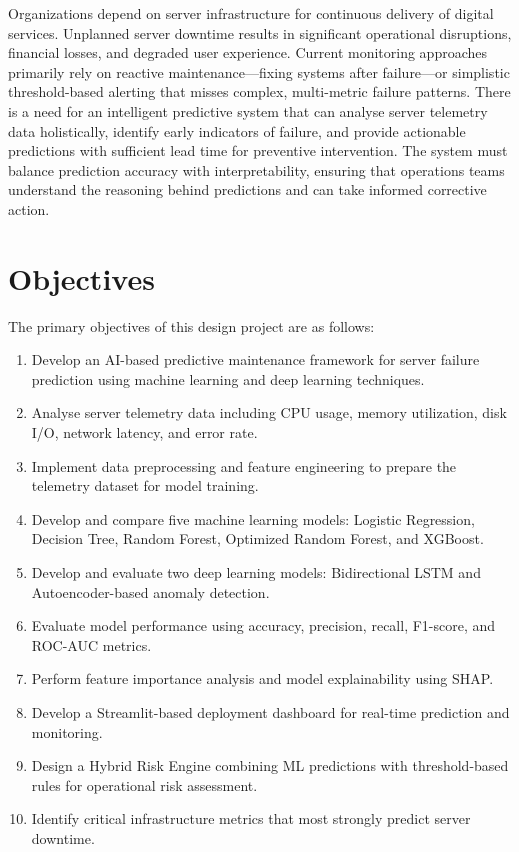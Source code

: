\documentclass[12pt,letterpaper]{report}
\begin{document}
Organizations depend on server infrastructure for continuous delivery of digital services. Unplanned server downtime results in significant operational disruptions, financial losses, and degraded user experience. Current monitoring approaches primarily rely on reactive maintenance---fixing systems after failure---or simplistic threshold-based alerting that misses complex, multi-metric failure patterns. There is a need for an intelligent predictive system that can analyse server telemetry data holistically, identify early indicators of failure, and provide actionable predictions with sufficient lead time for preventive intervention. The system must balance prediction accuracy with interpretability, ensuring that operations teams understand the reasoning behind predictions and can take informed corrective action.

\section{Objectives}

The primary objectives of this design project are as follows:

\begin{enumerate}[label=\arabic*.]
  \item Develop an AI-based predictive maintenance framework for server failure prediction using machine learning and deep learning techniques.
  \item Analyse server telemetry data including CPU usage, memory utilization, disk I/O, network latency, and error rate.
  \item Implement data preprocessing and feature engineering to prepare the telemetry dataset for model training.
  \item Develop and compare five machine learning models: Logistic Regression, Decision Tree, Random Forest, Optimized Random Forest, and XGBoost.
  \item Develop and evaluate two deep learning models: Bidirectional LSTM and Autoencoder-based anomaly detection.
  \item Evaluate model performance using accuracy, precision, recall, F1-score, and ROC-AUC metrics.
  \item Perform feature importance analysis and model explainability using SHAP.
  \item Develop a Streamlit-based deployment dashboard for real-time prediction and monitoring.
  \item Design a Hybrid Risk Engine combining ML predictions with threshold-based rules for operational risk assessment.
  \item Identify critical infrastructure metrics that most strongly predict server downtime.
\end{enumerate}
\end{document}

